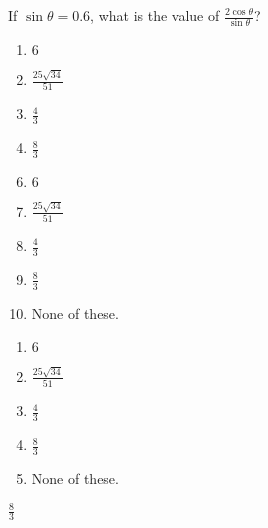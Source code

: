  
If $\sin \theta = 0.6$, what is the value of {\large $\frac{2\cos\theta}{\sin\theta}$}?


\ifsat
	\begin{enumerate}[label=\Alph*)]
		\item $6 $
		\item {\large$\frac{25\sqrt{34}}{51} $}
		\item {\large$\frac{4}{3} $}
		\item {\large$\frac{8}{3} $} %
	\end{enumerate}
\else
\fi

\ifacteven
	\begin{enumerate}[label=\textbf{\Alph*.},itemsep=\fill,align=left]
		\setcounter{enumii}{5}
		\item $6 $
		\item {\large$\frac{25\sqrt{34}}{51} $}
		\item {\large$\frac{4}{3} $}
		\addtocounter{enumii}{1}
		\item {\large$\frac{8}{3} $} %
		\item None of these. 
	\end{enumerate}
\else
\fi

\ifactodd
	\begin{enumerate}[label=\textbf{\Alph*.},itemsep=\fill,align=left]
		\item $6 $
		\item {\large$\frac{25\sqrt{34}}{51} $}
		\item {\large$\frac{4}{3} $}
		\item {\large$\frac{8}{3} $} %
		\item None of these. 
	\end{enumerate}
\else
\fi

\ifgridin
 {\large$\frac{8}{3} $} %

\else
\fi

